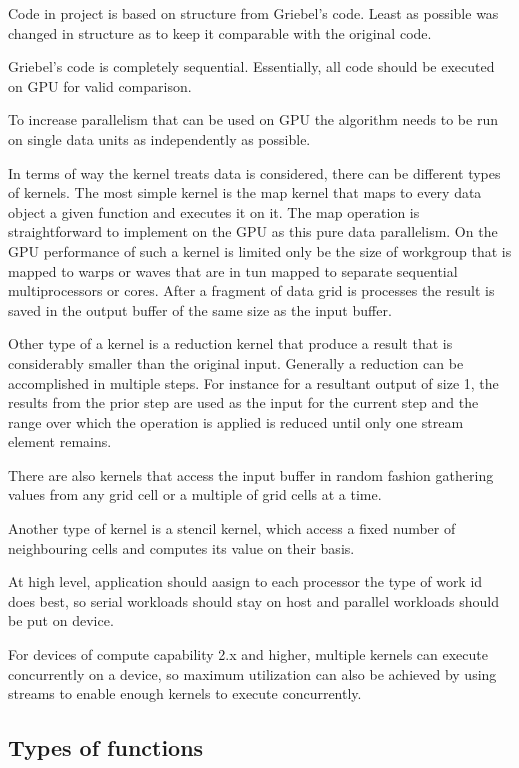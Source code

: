 Code in project is based on structure from Griebel's code. Least as possible was changed in structure as to keep it comparable with the original code.


Griebel's code is completely sequential. Essentially, all code should be executed on GPU for valid comparison. 

To increase parallelism that can be used on GPU the algorithm needs to be run on single data units as independently as possible.

In terms of way the kernel treats data is considered, there can be different types of kernels. The most simple kernel is the map kernel that maps to every data object a given function and executes it on it. The map operation is straightforward to implement on the GPU as this pure data parallelism. On the GPU performance of such a kernel is limited only be the size of workgroup that is mapped to warps or waves that are in tun mapped to separate sequential multiprocessors or cores. After a fragment of data grid is processes the result is saved in the output buffer of the same size as the input buffer.

Other type of a kernel is a reduction kernel that produce a result that is considerably smaller than the original input. Generally a reduction can be accomplished in multiple steps. For instance for a resultant output of size 1, the results from the prior step are used as the input for the current step and the range over which the operation is applied is reduced until only one stream element remains.

There are also kernels that access the input buffer in random fashion gathering values from any grid cell or a multiple of grid cells at a time.

Another type of kernel is a stencil kernel, which access a fixed number of neighbouring cells and computes its value on their basis.

At high level, application should aasign to each processor the type of work id does best, so serial workloads should stay on host and parallel workloads should be put on device. 

For devices of compute capability 2.x and higher, multiple kernels can execute concurrently on a device, so maximum utilization can also be achieved by using streams to enable enough kernels to execute concurrently. \cite{nvidia2009openclprog}

\subsection{Types of functions}

